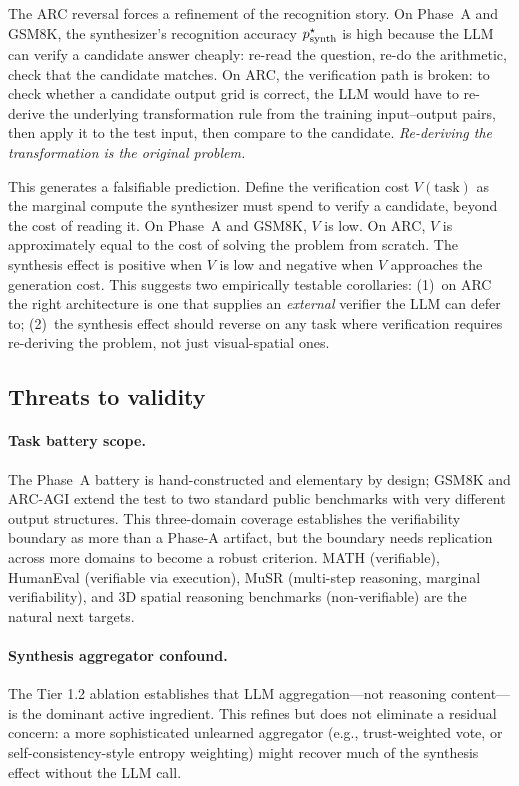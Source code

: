 \documentclass[11pt]{amsart}
\newcommand\1{{\mathds{1}}}
\theoremstyle{definition}
\theoremstyle{remark}
\numberwithin{equation}{section}
\begin{document}
The ARC reversal forces a refinement of the recognition story.
On Phase~A and GSM8K, the synthesizer's recognition accuracy $p_{\rm synth}^\star$ is high because the LLM can verify a candidate answer cheaply: re-read the question, re-do the arithmetic, check that the candidate matches.
On ARC, the verification path is broken: to check whether a candidate output grid is correct, the LLM would have to re-derive the underlying transformation rule from the training input--output pairs, then apply it to the test input, then compare to the candidate.
\emph{Re-deriving the transformation is the original problem.}

This generates a falsifiable prediction.
Define the verification cost $V(\text{task})$ as the marginal compute the synthesizer must spend to verify a candidate, beyond the cost of reading it.
On Phase~A and GSM8K, $V$ is low.
On ARC, $V$ is approximately equal to the cost of solving the problem from scratch.
The synthesis effect is positive when $V$ is low and negative when $V$ approaches the generation cost.
This suggests two empirically testable corollaries: (1)~on ARC the right architecture is one that supplies an \emph{external} verifier the LLM can defer to; (2)~the synthesis effect should reverse on any task where verification requires re-deriving the problem, not just visual-spatial ones.

\subsection{Threats to validity}\label{app:threats}

\paragraph{Task battery scope.}
The Phase~A battery is hand-constructed and elementary by design; GSM8K and ARC-AGI extend the test to two standard public benchmarks with very different output structures.
This three-domain coverage establishes the verifiability boundary as more than a Phase-A artifact, but the boundary needs replication across more domains to become a robust criterion.
MATH \cite{Hendrycks2021MATH} (verifiable), HumanEval \cite{Chen2021HumanEval} (verifiable via execution), MuSR \cite{Sprague2024MuSR} (multi-step reasoning, marginal verifiability), and 3D spatial reasoning benchmarks (non-verifiable) are the natural next targets.

\paragraph{Synthesis aggregator confound.}
The Tier 1.2 ablation establishes that LLM aggregation---not reasoning content---is the dominant active ingredient.
This refines but does not eliminate a residual concern: a more sophisticated unlearned aggregator (e.g., trust-weighted vote, or self-consistency-style entropy weighting) might recover much of the synthesis effect without the LLM call.
\end{document}
